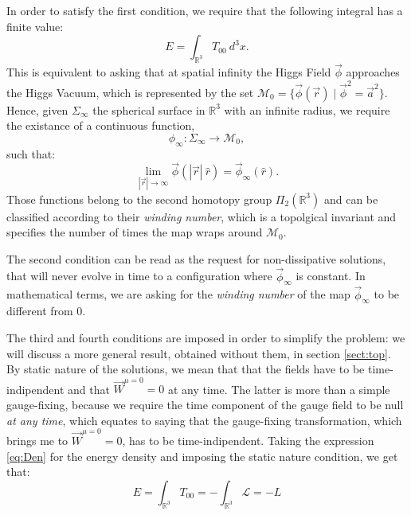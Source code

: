  In order to satisfy the first condition, we require that the following integral has a finite value: 
 \begin{equation}
 E = \int_{\mathbb{R}^3} T_{00} \ d^3x.
 \end{equation}
 This is equivalent to asking that at spatial infinity the Higgs Field $\vec{\phi}$ approaches the Higgs Vacuum, which is represented by the set $\mathcal{M}_0 = \{ \vec{\phi}(\vec{r})  \mid  \vec{\phi}^2 = \vec{a}^2 \}$. 
 Hence, given $\Sigma_{\infty}$ the spherical surface in $\mathbb{R}^3$ with an infinite radius, we require the existance of a continuous function, 
 \begin{equation}
     \phi_{\infty} \colon \Sigma_{\infty}  \to \mathcal{M}_0 ,
  \end{equation}
 such that:
 \begin{equation}
     \lim_{|\vec{r}|\to \infty} \vec{\phi}(|\vec{r}| \ \hat{r}) = \vec{\phi}_{\infty}(\hat{r}).
 \end{equation}
  Those functions belong to the second homotopy group $\Pi_2(\mathbb{R}^3)$ and can be classified according to their \textit{winding number}, which is a topolgical invariant and specifies the number of times the map wraps around $\mathcal{M}_0$.
  \medskip
  
  The second condition can be read as the request for non-dissipative solutions, that will never evolve in time to a configuration where $\vec{\phi}_{\infty}$ is constant. In mathematical terms, we are asking for the \textit{winding number} of the map $\vec{\phi}_{\infty}$ to be different from 0.
  \medskip
  
  The third and fourth conditions are imposed in order to simplify the problem: we will discuss a more general result, obtained without them, in section \ref{sect:top}.
  By static nature of the solutions, we mean that that the fields have to be time-indipendent and that $\vec{W}^{\mu = 0}= 0$ at any time. The latter is more than a simple gauge-fixing, because we require the time component of the gauge field to be null \textit{at any time}, which equates to saying that the gauge-fixing transformation, which brings me to $ \vec{W}^{\mu = 0}= 0$, has to be time-indipendent. Taking the expression \ref{eq:Den} for the energy density and imposing the static nature condition, we get that: 
  \begin{equation}
      E = \int_{\mathbb{R}^3} T_{00} = - \int_{\mathbb{R}^3} \mathcal{L} = -L
      \label{eq:En}
  \end{equation}
 
